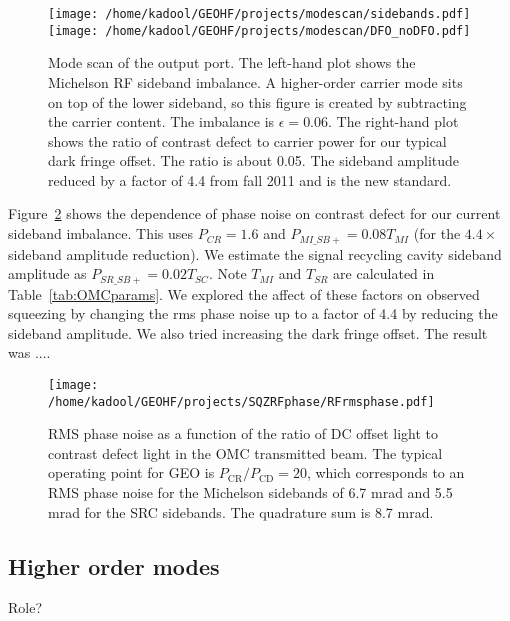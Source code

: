 \documentclass{ligodoc}
\begin{document}
\begin{figure}
\begin{centering}
\texttt{[image: /home/kadool/GEOHF/projects/modescan/sidebands.pdf]}\texttt{[image: /home/kadool/GEOHF/projects/modescan/DFO\_noDFO.pdf]}
\caption{Mode scan of the output port. The left-hand plot shows the
  Michelson RF sideband imbalance. A higher-order carrier mode sits on
  top of the lower sideband, so this figure is created by subtracting
  the carrier content. The imbalance is $\epsilon = 0.06$. The
  right-hand plot shows the ratio of contrast defect to carrier power
  for our typical dark fringe offset. The ratio is about 0.05. The
  sideband amplitude reduced by a factor of 4.4 from fall 2011 and is
  the new standard.}
\label{fig:modescan}
\end{centering}
\end{figure}

Figure~\ref{fig:phirms} shows the dependence of phase noise on
contrast defect for our current sideband imbalance. This uses
$P_{CR}=1.6$ and $P_{MI\_SB+}=0.08 T_{MI}$ (for the $4.4\times$
sideband amplitude reduction). We estimate the signal recycling cavity
sideband amplitude as $P_{SR\_SB+}=0.02 T_{SC}$. Note $T_{MI}$ and
$T_{SR}$ are calculated in Table~\ref{tab:OMCparams}. We explored the
affect of these factors on observed squeezing by changing the rms
phase noise up to a factor of 4.4 by reducing the sideband
amplitude. We also tried increasing the dark fringe offset. The result
was .... %


\begin{figure}
\begin{centering}
\texttt{[image: /home/kadool/GEOHF/projects/SQZRFphase/RFrmsphase.pdf]}
\caption{RMS phase noise as a function of the ratio of DC offset light
  to contrast defect light in the OMC transmitted beam. The typical
  operating point for GEO is $P_{\mathrm{CR}}/P_{\mathrm{CD}}=20$,
  which corresponds to an RMS phase noise for the Michelson sidebands
  of 6.7 mrad and 5.5 mrad for the SRC sidebands. The quadrature sum
  is 8.7 mrad.}
\label{fig:phirms}
\end{centering}
\end{figure}



\subsection{Higher order modes}
Role?
\end{document}

